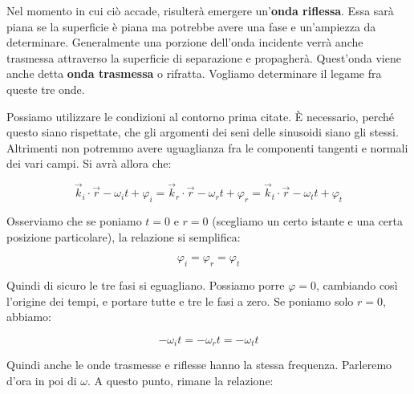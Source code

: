 \begin{figure}[htpb]
\end{figure}
\FloatBarrier

Nel momento in cui ciò accade, risulterà emergere un'\textbf{onda riflessa}. Essa sarà piana se la superficie è piana ma potrebbe avere una fase e un'ampiezza da determinare. Generalmente una porzione dell'onda incidente verrà anche trasmessa attraverso la superficie di separazione e propagherà. Quest'onda viene anche detta \textbf{onda trasmessa} o rifratta. Vogliamo determinare il legame fra queste tre onde.

Possiamo utilizzare le condizioni al contorno prima citate.
È necessario, perché questo siano rispettate, che gli argomenti dei seni delle sinusoidi siano gli stessi. Altrimenti non potremmo avere uguaglianza fra le componenti tangenti e normali dei vari campi. Si avrà allora che:

\[
	\vec{k}_i\cdot \vec{r} -\omega_it+\varphi_i = \vec{k}_r\cdot \vec{r} -\omega_rt+\varphi_r = \vec{k}_t\cdot \vec{r} -\omega_tt+\varphi_t
\]

Osserviamo che se poniamo $t=0$ e $r=0$ (scegliamo un certo istante e una certa posizione particolare), la relazione si semplifica:

\[
	\varphi_i = \varphi_r = \varphi_t
\]

Quindi di sicuro le tre fasi si eguagliano. Possiamo porre $\varphi=0$, cambiando così l'origine dei tempi, e portare tutte e tre le fasi a zero.
Se poniamo solo $r=0$, abbiamo:

\[
	-\omega_it = -\omega_rt = -\omega_tt
\]

Quindi anche le onde trasmesse e riflesse hanno la stessa frequenza. Parleremo d'ora in poi di $\omega$. A questo punto, rimane la relazione:

